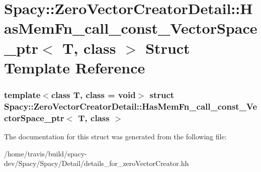 \hypertarget{structSpacy_1_1ZeroVectorCreatorDetail_1_1HasMemFn__call__const__VectorSpace__ptr}{\section{\-Spacy\-:\-:\-Zero\-Vector\-Creator\-Detail\-:\-:\-Has\-Mem\-Fn\-\_\-call\-\_\-const\-\_\-\-Vector\-Space\-\_\-ptr$<$ \-T, class $>$ \-Struct \-Template \-Reference}
\label{structSpacy_1_1ZeroVectorCreatorDetail_1_1HasMemFn__call__const__VectorSpace__ptr}
}
\subsubsection*{template$<$class T, class = void$>$ struct Spacy\-::\-Zero\-Vector\-Creator\-Detail\-::\-Has\-Mem\-Fn\-\_\-call\-\_\-const\-\_\-\-Vector\-Space\-\_\-ptr$<$ T, class $>$}



\-The documentation for this struct was generated from the following file\-:\begin{DoxyCompactItemize}
\item 
/home/travis/build/spacy-\/dev/\-Spacy/\-Spacy/\-Detail/details\-\_\-for\-\_\-zero\-Vector\-Creator.\-hh\end{DoxyCompactItemize}
